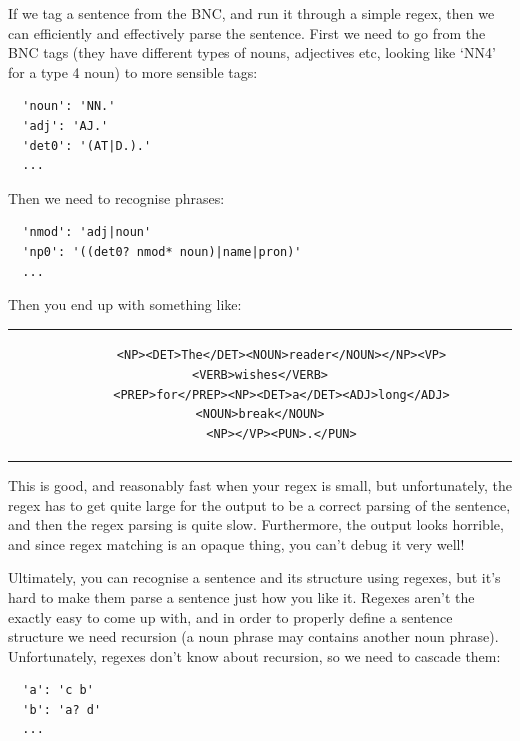 If we tag a sentence from the BNC, and run it through a simple regex, then we
can efficiently and effectively parse the sentence. First we need to go from the
BNC tags (they have different types of nouns, adjectives etc, looking like `NN4'
for a type 4 noun) to more sensible tags:

\begin{verbatim}
  'noun': 'NN.'
  'adj': 'AJ.'
  'det0': '(AT|D.).'
  ...
\end{verbatim}

Then we need to recognise phrases:

\begin{verbatim}
  'nmod': 'adj|noun'
  'np0': '((det0? nmod* noun)|name|pron)'
  ...
\end{verbatim}

Then you end up with something like:

\begin{center}
  \begin{tabular}{c}
    \begin{lstlisting}
      <NP><DET>The</DET><NOUN>reader</NOUN></NP><VP><VERB>wishes</VERB>
      <PREP>for</PREP><NP><DET>a</DET><ADJ>long</ADJ><NOUN>break</NOUN>
      <NP></VP><PUN>.</PUN>
    \end{lstlisting}
  \end{tabular}
\end{center}


This is good, and reasonably fast when your regex is small, but unfortunately,
the regex has to get quite large for the output to be a correct parsing of the
sentence, and then the regex parsing is quite slow. Furthermore, the output
looks horrible, and since regex matching is an opaque thing, you can't debug it
very well!

Ultimately, you can recognise a sentence and its structure using regexes, but
it's hard to make them parse a sentence just how you like it. Regexes aren't the
exactly easy to come up with, and in order to properly define a sentence
structure we need recursion (a noun phrase may contains another noun phrase).
Unfortunately, regexes don't know about recursion, so we need to cascade them:

\begin{verbatim}
  'a': 'c b'
  'b': 'a? d'
  ...
\end{verbatim}

